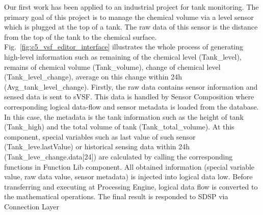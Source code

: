 Our first work has been applied to an industrial project for tank monitoring. The primary goal of this project is to manage the chemical volume via a level sensor which is plugged at the top of a tank.  The raw data of this sensor is the distance from the top of the tank to the chemical surface. Fig.~\ref{fig:c5_vsf_editor_interface} illustrates the whole process of generating high-level information such as remaining of the chemical level (Tank\_level), remains of chemical volume (Tank\_volume), change of chemical level (Tank\_level\_change), average on this change within 24h (Avg\_tank\_level\_change). Firstly, the raw data contains sensor information and sensed data is sent to sVSF. This data is handled by Sensor Composition where corresponding logical data-flow and sensor metadata is loaded from the database. In this case, the metadata is the tank information such as the height of tank (Tank\_high) and the total volume of tank (Tank\_total\_volume). At this component, special variables such as last value of such sensor (Tank\_leve.lastValue) or historical sensing data within 24h (Tank\_leve\_change.data[24]) are calculated by calling the corresponding functions in Function Lib component. All obtained information (special variable value, raw data value, sensor metadata) is injected into logical data low. Before transferring and executing at Processing Engine, logical data flow is converted to the mathematical operations. The final result is responded to SDSP via Connection Layer\\

